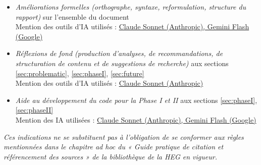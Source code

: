 \documentclass[a4paper, 11pt]{article}
\newcounter{annexecounter}
\newcommand{\annexe}[1]{%
  \stepcounter{annexecounter}
  \phantomsection
  \addcontentsline{toc}{section}{Annexe \theannexecounter~: #1}
  \begin{center}
    \bfseries\Large Annexe \theannexecounter~: #1
  \end{center}
  \vspace{1em}
}
\newenvironment{puce}{\begin{itemize}}{\end{itemize}}
\begin{document}
\begin{puce}
\item \textit{Améliorations formelles (orthographe, syntaxe, reformulation, structure du rapport)} sur l'ensemble du document \\
    Mention des outils d'IA utilisés : \underline{Claude Sonnet (Anthropic), Gemini Flash (Google)}
\item \textit{Réflexions de fond (production d'analyses, de recommandations, de structuration de contenu et de suggestions de recherche)} 
    aux sections \ref{sec:problematic}, \ref{sec:phaseI}, \ref{sec:future} \\
    Mention des outils d'IA utilisés : \underline{Claude Sonnet (Anthropic)}
\item \textit{Aide au développement du code pour la Phase I et II} aux sections \ref{sec:phaseI}, \ref{sec:phaseII} \\
    Mention des IA utilisées : \underline{Claude Sonnet (Anthropic), Gemini Flash (Google)}
\end{puce}

\textit{Ces indications ne se substituent pas à l’obligation de se conformer aux règles mentionnées dans le chapitre ad hoc du « Guide pratique de citation et référencement des sources » de la bibliothèque de la HEG en vigueur.}

%
\end{document}

